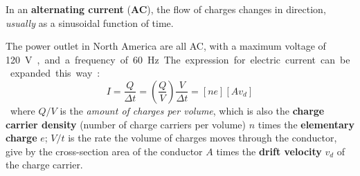 In an \textbf{alternating current} (\textbf{AC}), the flow of charges changes
in direction, \emph{usually} as a sinusoidal function of time.
\begin{figure}[ht]
  \centering
  \begin{subfigure}{.35\textwidth}
    \centering
  \end{subfigure}
  \begin{subfigure}{.35\textwidth}
    \centering
  \end{subfigure}
\end{figure}

The power outlet in North America are all AC, with a maximum voltage of
\SI{120}\volt, and a frequency of \SI{60}\hertz.


The expression for electric current can be expanded this way:

\begin{equation}
  I=\frac Q{\Delta t}=\left(\frac QV\right)\frac V{\Delta t}
  =\left[ne\right]\left[Av_d\right]
\end{equation}
where $Q/V$ is the \emph{amount of charges per volume}, which is also the
\textbf{charge carrier density} (number of charge carriers per volume) $n$
times the \textbf{elementary charge} $e$; $V/t$ is the rate the volume of
charges moves through the conductor, give by the cross-section area of the
conductor $A$ times the \textbf{drift velocity} $v_d$ of the charge carrier.


